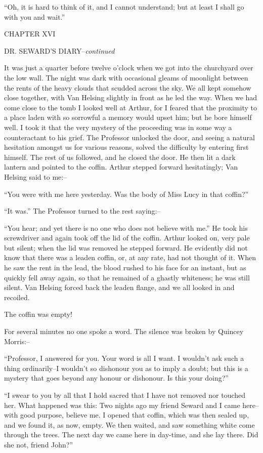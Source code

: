 \documentclass[12pt,openright]{book}
\begin{document}
“Oh, it is hard to think of it, and I cannot understand; but at least I shall go with you and wait.”

CHAPTER XVI

DR. SEWARD’S DIARY–\textit{continued}

It was just a quarter before twelve o’clock when we got into the churchyard over the low wall. The night was dark with occasional gleams of moonlight between the rents of the heavy clouds that scudded across the sky. We all kept somehow close together, with Van Helsing slightly in front as he led the way. When we had come close to the tomb I looked well at Arthur, for I feared that the proximity to a place laden with so sorrowful a memory would upset him; but he bore himself well. I took it that the very mystery of the proceeding was in some way a counteractant to his grief. The Professor unlocked the door, and seeing a natural hesitation amongst us for various reasons, solved the difficulty by entering first himself. The rest of us followed, and he closed the door. He then lit a dark lantern and pointed to the coffin. Arthur stepped forward hesitatingly; Van Helsing said to me:–

“You were with me here yesterday. Was the body of Miss Lucy in that coffin?”

“It was.” The Professor turned to the rest saying:–

“You hear; and yet there is no one who does not believe with me.” He took his screwdriver and again took off the lid of the coffin. Arthur looked on, very pale but silent; when the lid was removed he stepped forward. He evidently did not know that there was a leaden coffin, or, at any rate, had not thought of it. When he saw the rent in the lead, the blood rushed to his face for an instant, but as quickly fell away again, so that he remained of a ghastly whiteness; he was still silent. Van Helsing forced back the leaden flange, and we all looked in and recoiled.

The coffin was empty!

For several minutes no one spoke a word. The silence was broken by Quincey Morris:–

“Professor, I answered for you. Your word is all I want. I wouldn’t ask such a thing ordinarily–I wouldn’t so dishonour you as to imply a doubt; but this is a mystery that goes beyond any honour or dishonour. Is this your doing?”

“I swear to you by all that I hold sacred that I have not removed nor touched her. What happened was this: Two nights ago my friend Seward and I came here–with good purpose, believe me. I opened that coffin, which was then sealed up, and we found it, as now, empty. We then waited, and saw something white come through the trees. The next day we came here in day-time, and she lay there. Did she not, friend John?”
\end{document}
